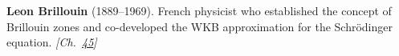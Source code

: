 \textbf{Leon Brillouin} (1889–1969). French physicist who established the concept of Brillouin zones and co-developed the WKB approximation for the Schr\"{o}dinger equation. \emph{[Ch.~\hyperref[ch:maxwelldemon]{45}]}

